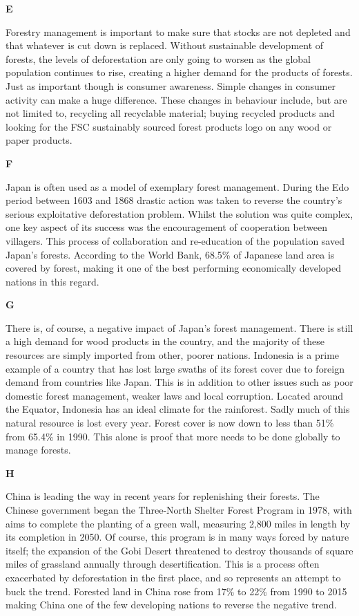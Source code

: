 \documentclass{../templateReading/cdreading}
\begin{document}
\textbf{E}\par

Forestry management is important to make sure that stocks are not depleted and that whatever is cut down is replaced. Without sustainable development of forests, the levels of deforestation are only going to worsen as the global population continues to rise, creating a higher demand for the products of forests. Just as important though is consumer awareness. Simple changes in consumer activity can make a huge difference. These changes in behaviour include, but are not limited to, recycling all recyclable material; buying recycled products and looking for the FSC sustainably sourced forest products logo on any wood or paper products.

\textbf{F}\par

Japan is often used as a model of exemplary forest management. During the Edo period between 1603 and 1868 drastic action was taken to reverse the country’s serious exploitative deforestation problem. Whilst the solution was quite complex, one key aspect of its success was the encouragement of cooperation between villagers. This process of collaboration and re-education of the population saved Japan’s forests. According to the World Bank, 68.5\% of Japanese land area is covered by forest, making it one of the best performing economically developed nations in this regard.

\textbf{G}\par

There is, of course, a negative impact of Japan’s forest management. There is still a high demand for wood products in the country, and the majority of these resources are simply imported from other, poorer nations. Indonesia is a prime example of a country that has lost large swaths of its forest cover due to foreign demand from countries like Japan. This is in addition to other issues such as poor domestic forest management, weaker laws and local corruption. Located around the Equator, Indonesia has an ideal climate for the rainforest. Sadly much of this natural resource is lost every year. Forest cover is now down to less than 51\% from 65.4\% in 1990. This alone is proof that more needs to be done globally to manage forests.

\textbf{H}\par

China is leading the way in recent years for replenishing their forests. The Chinese government began the Three-North Shelter Forest Program in 1978, with aims to complete the planting of a green wall, measuring 2,800 miles in length by its completion in 2050. Of course, this program is in many ways forced by nature itself; the expansion of the Gobi Desert threatened to destroy thousands of square miles of grassland annually through desertification. This is a process often exacerbated by deforestation in the first place, and so represents an attempt to buck the trend. Forested land in China rose from 17\% to 22\% from 1990 to 2015 making China one of the few developing nations to reverse the negative trend.
\end{document}
